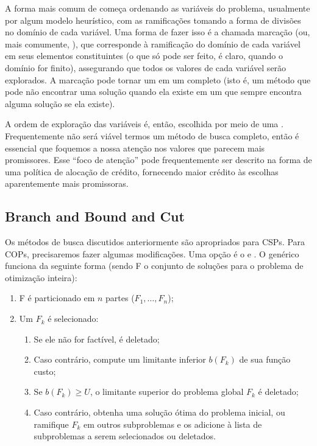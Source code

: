 A forma mais comum de  começa ordenando as
variáveis do problema, usualmente por algum modelo heurístico, com as
ramificações tomando a forma de divisões no domínio de cada
variável. Uma forma de fazer isso é a chamada marcação (ou, mais
comumente, ), que corresponde à ramificação do
domínio de cada variável em seus elementos constituintes (o que só
pode ser feito, é claro, quando o domínio for finito), assegurando que
todos os valores de cada variável serão explorados. A marcação pode
tornar um  em um completo (isto
é, um método que pode não encontrar uma solução quando ela existe em
um que sempre encontra alguma solução se ela existe).

A ordem de exploração das variáveis é, então, escolhida por meio de
uma . Frequentemente não será
viável termos um método de busca completo, então é essencial que
foquemos a nossa atenção nos valores que parecem mais
promissores. Esse ``foco de atenção'' pode frequentemente ser descrito
na forma de uma política de alocação de crédito, fornecendo maior
crédito às escolhas aparentemente mais promissoras.

\subsection{Branch and Bound and Cut}

Os métodos de busca discutidos anteriormente são apropriados para
CSPs. Para COPs, precisaremos fazer algumas modificações. Uma opção é
o  e . O
 genérico funciona da seguinte forma
(sendo F o conjunto de soluções para o problema de otimização
inteira):

\begin{enumerate}
\item F é particionado em $n$ partes ($F_1, \hdots, F_n$);
\item Um $F_k$ é selecionado:
  \begin{enumerate}
  \item Se ele não for factível, é deletado;
  \item Caso contrário, compute um limitante inferior $b(F_k)$ de
    sua função custo;
  \item Se $b(F_k) \geq U$, o limitante superior do problema
    global $F_k$ é deletado;
  \item Caso contrário, obtenha uma solução ótima do problema
    inicial, ou ramifique $F_k$ em outros subproblemas e os
    adicione à lista de subproblemas a serem selecionados ou
    deletados.
  \end{enumerate}
\end{enumerate}

